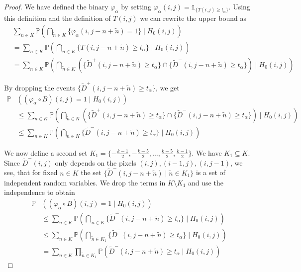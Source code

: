 \documentclass[a4paper,12pt]{article}
\theoremstyle{plain}
\theoremstyle{definition}
\theoremstyle{remark}
\begin{document}
\begin{proof}
	We have defined the binary $\varphi_\alpha$ by setting $\varphi_\alpha(i, j) = \mathds{1}_{ \{ T(i, j) \geq t_\alpha \} }$. Using this definition and the definition of $T(i, j)$ we can rewrite the upper bound as
	\begin{align*}
		&\sum_{n \in K} \mathbb{P}\left( \bigcap_{\tilde{n} \in K} \{ \varphi_\alpha(i, j - n + \tilde{n}) = 1 \} \mid H_0(i, j) \right) \\
		&= \sum_{n \in K} \mathbb{P}\left( \bigcap_{\tilde{n} \in K} \{ T(i, j - n + \tilde{n}) \geq t_\alpha \} \mid H_0(i, j) \right) \\
		&= \sum_{n \in K} \mathbb{P}\left( \bigcap_{\tilde{n} \in K} \left( \{ \tilde{D}^+(i, j - n + \tilde{n}) \geq t_\alpha \} \cap \{ \tilde{D}^-(i, j - n + \tilde{n}) \geq t_\alpha \} \right) \mid H_0(i, j) \right)
	\end{align*}
	
	By dropping the events $\{ \tilde{D}^+(i, j - n + \tilde{n}) \geq t_\alpha \}$, we get
	\begin{align*}
		\mathbb{P}&( (\varphi_\alpha \circ B)(i, j) = 1 \mid H_0(i, j) ) \\
		&\leq \sum_{n \in K} \mathbb{P}\left( \bigcap_{\tilde{n} \in K} \left( \{ \tilde{D}^+(i, j - n + \tilde{n}) \geq t_\alpha \} \cap \{ \tilde{D}^-(i, j - n + \tilde{n}) \geq t_\alpha \} \right) \mid H_0(i, j) \right) \\
		&\leq \sum_{n \in K} \mathbb{P}\left( \bigcap_{\tilde{n} \in K} \{ \tilde{D}^-(i, j - n + \tilde{n}) \geq t_\alpha \} \mid H_0(i, j) \right)
	\end{align*}
	
	We now define a second set $K_1 = \{ -\frac{k - 1}{2}, -\frac{k - 5}{2}, \dots, \frac{k - 5}{2}, \frac{k - 1}{2} \}$. We have $K_1 \subseteq K$. Since $\tilde{D}^-(i, j)$ only depends on the pixels $(i, j), (i - 1, j), (i, j - 1)$, we see, that for fixed $n \in K$ the set $\{ \tilde{D}^-(i, j - n + \tilde{n}) \mid \tilde{n} \in K_1 \}$ is a set of independent random variables. We drop the terms in $K \setminus K_1$ and use the independence to obtain
	\begin{align*}
		\mathbb{P}&( (\varphi_\alpha \circ B)(i, j) = 1 \mid H_0(i, j) ) \\
		&\leq \sum_{n \in K} \mathbb{P}\left( \bigcap_{\tilde{n} \in K} \{ \tilde{D}^-(i, j - n + \tilde{n}) \geq t_\alpha \} \mid H_0(i, j) \right) \\
		&\leq \sum_{n \in K} \mathbb{P}\left( \bigcap_{\tilde{n} \in K_1} \{ \tilde{D}^-(i, j - n + \tilde{n}) \geq t_\alpha \} \mid H_0(i, j) \right) \\
		&= \sum_{n \in K} \prod_{\tilde{n} \in K_1} \mathbb{P}\left( \tilde{D}^-(i, j - n + \tilde{n}) \geq t_\alpha \mid H_0(i, j) \right)
	\end{align*}
	

\end{proof}
\end{document}
